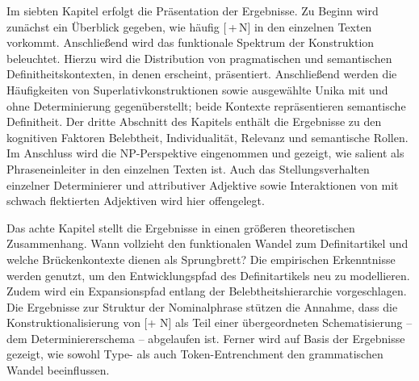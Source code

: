 Im siebten Kapitel erfolgt die Präsentation der Ergebnisse. Zu Beginn wird zunächst ein Überblick gegeben, wie häufig [\,+\,N] in den einzelnen Texten vorkommt. Anschließend wird das funktionale Spektrum der Konstruktion beleuchtet. Hierzu wird die Distribution von pragmatischen und semantischen Definitheitskontexten, in denen  erscheint, präsentiert. Anschließend werden die Häufigkeiten von Superlativkonstruktionen sowie ausgewählte Unika mit und ohne Determinierung gegenüberstellt; beide Kontexte repräsentieren semantische Definitheit. Der dritte Abschnitt des Kapitels enthält die Ergebnisse zu den kognitiven Faktoren Belebtheit, Individualität, Relevanz und semantische Rollen. Im Anschluss wird die NP-Perspektive eingenommen und gezeigt, wie salient  als Phraseneinleiter in den einzelnen Texten ist. Auch das Stellungsverhalten einzelner Determinierer und attributiver Adjektive sowie Interaktionen von  mit schwach flektierten Adjektiven wird hier offengelegt. 

Das achte Kapitel stellt die Ergebnisse in einen größeren theoretischen Zusammenhang. Wann vollzieht  den funktionalen Wandel zum Definitartikel und welche Brückenkontexte dienen als Sprungbrett? Die empirischen Erkenntnisse werden genutzt, um den Entwicklungspfad des Definitartikels neu zu modellieren. Zudem wird ein Expansionspfad entlang der Belebtheitshierarchie vorgeschlagen. Die Ergebnisse zur Struktur der Nominalphrase  stützen die Annahme, dass die Konstruktionalisierung von [+ N] als Teil einer übergeordneten Schematisierung -- dem Determiniererschema -- abgelaufen ist. Ferner wird auf Basis der Ergebnisse gezeigt, wie sowohl Type- als auch Token-Entrenchment den grammatischen Wandel beeinflussen.
